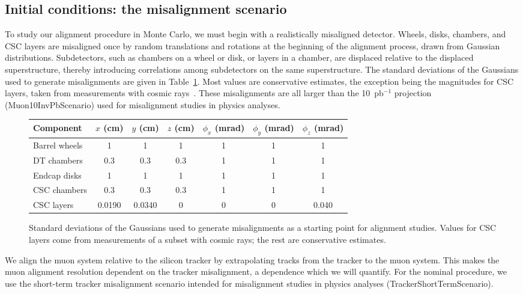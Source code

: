 \documentclass[12pt]{article}
\begin{document}
\subsection{Initial conditions: the misalignment scenario}

To study our alignment procedure in Monte Carlo, we must begin with a
realistically misaligned detector.  Wheels, disks, chambers, and CSC
layers are misaligned once by random translations and rotations at the
beginning of the alignment process, drawn from Gaussian distributions.
Subdetectors, such as chambers on a wheel or disk, or layers in a
chamber, are displaced relative to the displaced superstructure,
thereby introducing correlations among subdetectors on the same
superstructure.  The standard deviations of the Gaussians used to
generate misalignments are given in Table~\ref{misalignments}.  Most
values are conservative estimates, the exception being the magnitudes
for CSC layers, taken from measurements with cosmic
rays~\cite{karoly_layer_misalignments}.  These misalignments are all
larger than the 10~pb$^{-1}$ projection (Muon10InvPbScenario) used for
misalignment studies in physics analyses.

\begin{figure}
\begin{center}
\begin{tabular}{l c c c c c c}
\hline\hline Component & $x$ (cm) & $y$ (cm) & $z$ (cm) & $\phi_x$ (mrad) & $\phi_y$ (mrad) & $\phi_z$ (mrad) \\\hline
Barrel wheels & 1 & 1 & 1 & 1 & 1 & 1 \\
DT chambers & 0.3 & 0.3 & 0.3 & 1 & 1 & 1 \\\hline
Endcap disks & 1 & 1 & 1 & 1 & 1 & 1 \\
CSC chambers & 0.3 & 0.3 & 0.3 & 1 & 1 & 1 \\
CSC layers & 0.0190 & 0.0340 & 0 & 0 & 0 & 0.040 \\\hline\hline
\end{tabular}
\end{center}

\caption{\label{misalignments} Standard deviations of the Gaussians
used to generate misalignments as a starting point for alignment
studies.  Values for CSC layers come from measurements of a subset
with cosmic rays; the rest are conservative estimates.}
\end{figure}

We align the muon system relative to the silicon tracker by
extrapolating tracks from the tracker to the muon system.  This makes
the muon alignment resolution dependent on the tracker misalignment, a
dependence which we will quantify.  For the nominal procedure, we use
the short-term tracker misalignment scenario intended for misalignment
studies in physics analyses (TrackerShortTermScenario).
\end{document}
